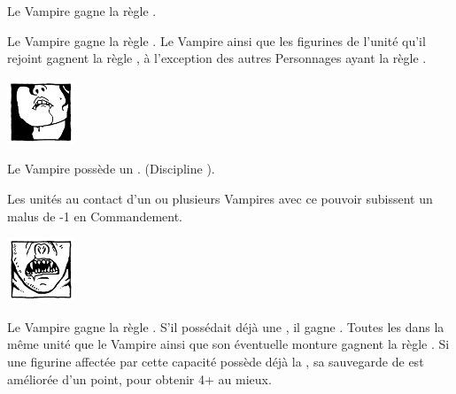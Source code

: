 \begin{multicols}{2}
\vspace*{-0.2cm}
\startpricelist

 Le Vampire gagne la règle .

 Le Vampire gagne la règle \awaken{\zombies{}, \direwolves{}, \batswarms{}, \greatbats{}}. Le Vampire ainsi que les figurines de l'unité qu'il rejoint gagnent la règle \swiftstride{}, à l'exception des autres Personnages ayant la règle \vampiric{}.

\endpricelist

\begin{center}\includegraphics[width=2cm]{pics/logo_lamia.png}\end{center}
\vspace*{-1.5cm}

\vspace*{-0.2cm}
\startpricelist

 Le Vampire possède un . \lustspellfour{} (Discipline \lust{}).

 Les unités au contact d'un ou plusieurs Vampires avec ce pouvoir subissent un malus de -1 en Commandement.

\endpricelist
\columnbreak

\begin{center}\includegraphics[width=2cm]{pics/logo_strigoi.png}\end{center}
\vspace*{-1.5cm}

\vspace*{-0.2cm}
\startpricelist

 Le Vampire gagne la règle . S'il possédait déjà une \regeneration{}, il gagne . Toutes les \ghouls{} dans la même unité que le Vampire ainsi que son éventuelle monture gagnent la règle . Si une figurine affectée par cette capacité possède déjà la \regeneration{}, sa sauvegarde de \regeneration{} est améliorée d'un point, pour obtenir 4+ au mieux.


\end{multicols}

